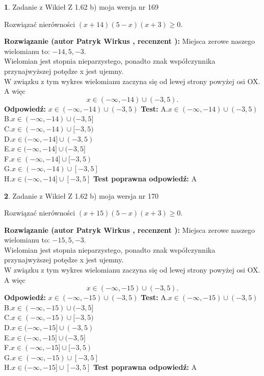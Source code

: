 \documentclass[12pt, a4paper]{article}
\theoremstyle{definition} %
\newtheorem{zad}{}
\newcommand{\zadStart}[1]{\begin{zad}#1\newline}
\newcommand{\zadStop}{\end{zad}}
\newcommand{\rozwStart}[2]{\noindent \textbf{Rozwiązanie (autor #1 , recenzent #2): }\newline}
\newcommand{\rozwStop}{\newline}
\newcommand{\odpStart}{\noindent \textbf{Odpowiedź:}\newline}
\newcommand{\odpStop}{\newline}
\newcommand{\testStart}{\noindent \textbf{Test:}\newline}
\newcommand{\testStop}{\newline}
\newcommand{\kluczStart}{\noindent \textbf{Test poprawna odpowiedź:}\newline}
\newcommand{\kluczStop}{\newline}
\begin{document}
\zadStart{Zadanie z Wikieł Z 1.62 b) moja wersja nr 169}

Rozwiązać nierówności $(x+14)(5-x)(x+3)\ge0$.
\zadStop
\rozwStart{Patryk Wirkus}{}
Miejsca zerowe naszego wielomianu to: $-14, 5, -3$.\\
Wielomian jest stopnia nieparzystego, ponadto znak współczynnika przy\linebreak najwyższej potędze x jest ujemny.\\ W związku z tym wykres wielomianu zaczyna się od lewej strony powyżej osi OX. A więc $$x \in (-\infty,-14) \cup (-3,5).$$
\rozwStop
\odpStart
$x \in (-\infty,-14) \cup (-3,5)$
\odpStop
\testStart
A.$x \in (-\infty,-14) \cup (-3,5)$\\
B.$x \in (-\infty,-14) \cup (-3,5]$\\
C.$x \in (-\infty,-14) \cup [-3,5)$\\
D.$x \in (-\infty,-14] \cup (-3,5)$\\
E.$x \in (-\infty,-14] \cup (-3,5]$\\
F.$x \in (-\infty,-14] \cup [-3,5)$\\
G.$x \in (-\infty,-14) \cup [-3,5]$\\
H.$x \in (-\infty,-14] \cup [-3,5]$
\testStop
\kluczStart
A
\kluczStop



\zadStart{Zadanie z Wikieł Z 1.62 b) moja wersja nr 170}

Rozwiązać nierówności $(x+15)(5-x)(x+3)\ge0$.
\zadStop
\rozwStart{Patryk Wirkus}{}
Miejsca zerowe naszego wielomianu to: $-15, 5, -3$.\\
Wielomian jest stopnia nieparzystego, ponadto znak współczynnika przy\linebreak najwyższej potędze x jest ujemny.\\ W związku z tym wykres wielomianu zaczyna się od lewej strony powyżej osi OX. A więc $$x \in (-\infty,-15) \cup (-3,5).$$
\rozwStop
\odpStart
$x \in (-\infty,-15) \cup (-3,5)$
\odpStop
\testStart
A.$x \in (-\infty,-15) \cup (-3,5)$\\
B.$x \in (-\infty,-15) \cup (-3,5]$\\
C.$x \in (-\infty,-15) \cup [-3,5)$\\
D.$x \in (-\infty,-15] \cup (-3,5)$\\
E.$x \in (-\infty,-15] \cup (-3,5]$\\
F.$x \in (-\infty,-15] \cup [-3,5)$\\
G.$x \in (-\infty,-15) \cup [-3,5]$\\
H.$x \in (-\infty,-15] \cup [-3,5]$
\testStop
\kluczStart
A
\kluczStop
\end{document}
